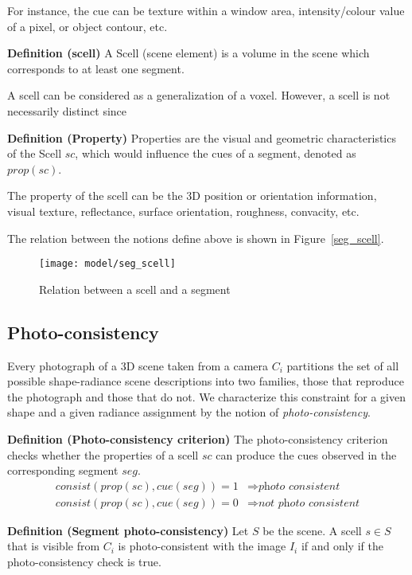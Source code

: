 For instance, the cue can be texture within a window area, intensity/colour value of a pixel, or object contour, etc.

\textbf{Definition (scell)} A Scell (scene element) is a volume in the scene which corresponds to at least one segment.

A scell can be considered as a generalization of a voxel. However, a scell is not necessarily distinct since

\textbf{Definition (Property)} Properties are the visual and geometric characteristics of the Scell $sc$, which would influence the cues of a segment, denoted as $prop(sc)$.

The property of the scell can be the 3D position or orientation information, visual texture, reflectance, surface orientation, roughness, convacity, etc.

The relation between the notions define above is shown in Figure~\ref{seg_scell}.
\begin{figure}[h]
\centering
\texttt{[image: model/seg\_scell]}
\caption{Relation between a scell and a segment}
\end{figure}


\subsection{Photo-consistency}
Every photograph of a 3D scene taken from a camera $C_i$ partitions the set of all possible shape-radiance scene descriptions into two families, those that reproduce the photograph and those that do not. We characterize this constraint for a given shape and a given radiance assignment by the notion of \textit{photo-consistency}.

\textbf{Definition (Photo-consistency criterion)} The photo-consistency criterion checks whether the properties of a scell $sc$ can produce the cues observed in the corresponding segment $seg$.
\begin{align*}
consist(prop(sc), cue(seg)) = 1 &\Rightarrow \textit{photo consistent}\\
consist(prop(sc), cue(seg)) = 0 &\Rightarrow \textit{not photo consistent}
\end{align*}

\textbf{Definition (Segment photo-consistency)} Let $S$ be the scene. A scell $s\in S$ that is visible from $C_i$ is photo-consistent with the image $I_i$ if and only if the photo-consistency check is true.

